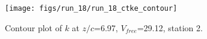 \begin{figure}[H]
\centering
\texttt{[image: figs/run\_18/run\_18\_ctke\_contour]}
\caption{Contour plot of $k$ at $z/c$=6.97, $V_{free}$=29.12, station 2.}
\label{fig:run_18_ctke_contour}
\end{figure}


